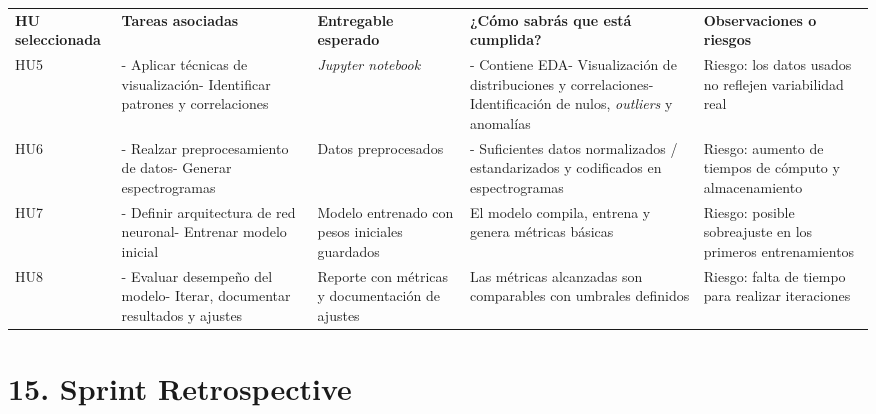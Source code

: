 \documentclass[
11pt, %
]{charter}
\begin{document}
\begin{table}[htpb]
\renewcommand{\arraystretch}{1.5}
\begin{tabular}{|>{\raggedright\arraybackslash}m{2.4cm}|
                >{\raggedright\arraybackslash}m{2.3cm}|
                >{\raggedright\arraybackslash}m{3cm}|
                >{\raggedright\arraybackslash}m{3cm}|
                >{\raggedright\arraybackslash}m{3cm}|}
\hline
\rowcolor[HTML]{CCCCCC}
\textbf{HU seleccionada} & \textbf{Tareas asociadas} & \textbf{Entregable esperado} & \textbf{¿Cómo sabrás que está cumplida?} & \textbf{Observaciones o riesgos} \\
HU5 & - Aplicar técnicas de visualización\newline - Identificar patrones y correlaciones & \textit{Jupyter notebook} &  - Contiene EDA\newline - Visualización de distribuciones y correlaciones\newline - Identificación de nulos, \textit{outliers} y anomalías & Riesgo: los datos usados no reflejen variabilidad real \\
\hline
HU6 & - Realzar preprocesamiento de datos\newline - Generar espectrogramas & Datos preprocesados & - Suficientes datos normalizados / estandarizados y codificados en espectrogramas & Riesgo: aumento de tiempos de cómputo y almacenamiento \\
\hline
HU7 & - Definir arquitectura de red neuronal\newline - Entrenar modelo inicial & Modelo entrenado con pesos iniciales guardados & El modelo compila, entrena y genera métricas básicas & Riesgo: posible sobreajuste en los primeros entrenamientos \\
\hline
HU8 & - Evaluar desempeño del modelo\newline - Iterar, documentar resultados y ajustes & Reporte con métricas y documentación de ajustes & Las métricas alcanzadas son comparables con umbrales definidos & Riesgo: falta de tiempo para realizar iteraciones \\
\hline
\end{tabular}
\end{table}

\newpage
\section{15. Sprint Retrospective}    
\label{sec:sprint_retro}

\end{document}
